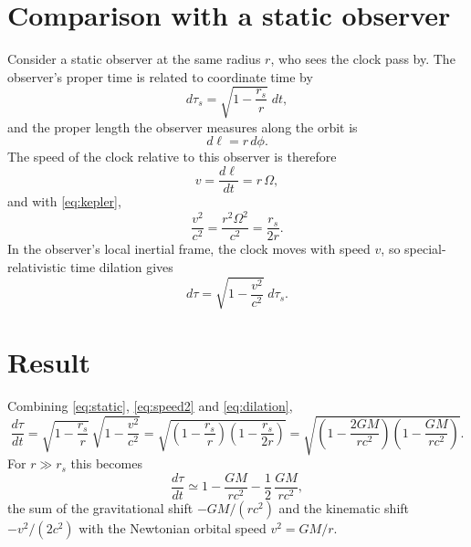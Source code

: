 \documentclass{article}
\begin{document}
\section{Comparison with a static observer}
Consider a static observer at the same radius $r$, who sees the clock pass by. The observer's proper time is related to coordinate time by
\begin{equation}
  d\tau_s = \sqrt{1 - \frac{r_s}{r}}\;dt ,
  \label{eq:static}
\end{equation}
and the proper length the observer measures along the orbit is
\begin{equation}
  d\ell = r\,d\phi .
  \label{eq:length}
\end{equation}
The speed of the clock relative to this observer is therefore
\begin{equation}
  v = \frac{d\ell}{dt} = r\,\Omega ,
  \label{eq:speed}
\end{equation}
and with \eqref{eq:kepler},
\begin{equation}
  \frac{v^2}{c^2} = \frac{r^2\Omega^2}{c^2} = \frac{r_s}{2r} .
  \label{eq:speed2}
\end{equation}
In the observer's local inertial frame, the clock moves with speed $v$, so special-relativistic time dilation gives
\begin{equation}
  d\tau = \sqrt{1 - \frac{v^2}{c^2}}\;d\tau_s .
  \label{eq:dilation}
\end{equation}

\section{Result}
Combining \eqref{eq:static}, \eqref{eq:speed2} and \eqref{eq:dilation},
\begin{equation}
  \frac{d\tau}{dt} = \sqrt{1 - \frac{r_s}{r}}\,\sqrt{1 - \frac{v^2}{c^2}} = \sqrt{\left(1 - \frac{r_s}{r}\right)\left(1 - \frac{r_s}{2r}\right)} = \sqrt{\left(1 - \frac{2GM}{rc^2}\right)\left(1 - \frac{GM}{rc^2}\right)} .
  \label{eq:result}
\end{equation}
For $r \gg r_s$ this becomes
\begin{equation}
  \frac{d\tau}{dt} \simeq 1 - \frac{GM}{rc^2} - \frac{1}{2}\,\frac{GM}{rc^2} ,
  \label{eq:weak}
\end{equation}
the sum of the gravitational shift $-GM/(rc^2)$ and the kinematic shift $-v^2/(2c^2)$ with the Newtonian orbital speed $v^2 = GM/r$.
\end{document}
